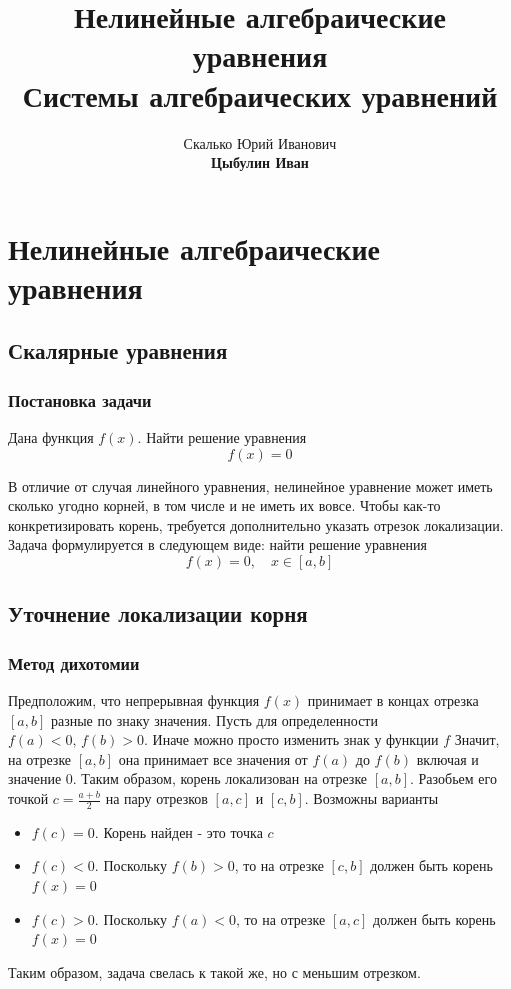 \documentclass[apectratio=43,unicode]{beamer}
\title[Нелиненые уравнения]{Нелинейные алгебраические уравнения\\Системы алгебраических уравнений}
\author[Цыбулин И.В.]{Скалько Юрий Иванович\\
\textbf{Цыбулин Иван}
}
\date{}
\begin{document}
\begin{frame}[plain]
\titlepage
\end{frame}

\section{ }

\def\A{{\bf A}}
\def\E{{\bf E}}
\def\F{{\bf F}}
\def\G{{\bf G}}
\def\H{{\bf H}}
\def\J{{\bf J}}
\def\x{{\bf x}}
\def\y{{\bf y}}
\def\b{{\bf b}}
\def\g{{\boldsymbol \varphi}}

\section{Нелинейные алгебраические уравнения}
\subsection{Скалярные уравнения}
\begin{frame}
\frametitle{Постановка задачи}
	Дана функция $f(x)$. Найти решение уравнения
	\[
	f(x) = 0
	\]

	В отличие от случая линейного уравнения, нелинейное уравнение может иметь сколько угодно корней,
	в том числе и не иметь их вовсе. Чтобы как-то конкретизировать корень, требуется дополнительно указать отрезок локализации.
	Задача формулируется в следующем виде: найти решение уравнения
	\[
	f(x) = 0, \quad x \in [a,b]
	\]
\end{frame}

\subsection{Уточнение локализации корня}
\begin{frame}
\frametitle{Метод дихотомии}
	Предположим, что непрерывная функция $f(x)$ принимает в концах отрезка $[a,b]$ разные по знаку значения.
	Пусть для определенности $f(a)<0,\, f(b)>0$. Иначе можно просто изменить знак у функции $f$
	Значит, на отрезке $[a,b]$ она принимает все значения от $f(a)$ до $f(b)$ включая и значение $0$.
	Таким образом, корень локализован на отрезке $[a,b]$. Разобьем его точкой $c = \frac{a+b}{2}$ на пару отрезков
	$[a,c]$ и $[c,b]$. Возможны варианты
	\begin{itemize}
		\item $f(c) = 0$. Корень найден - это точка $c$
		\item $f(c) < 0$. Поскольку $f(b) > 0$, то на отрезке $[c, b]$ должен быть корень $f(x) = 0$
		\item $f(c) > 0$. Поскольку $f(a) < 0$, то на отрезке $[a, c]$ должен быть корень $f(x) = 0$
	\end{itemize}
	Таким образом, задача свелась к такой же, но с меньшим отрезком.
\end{frame}
\end{document}
